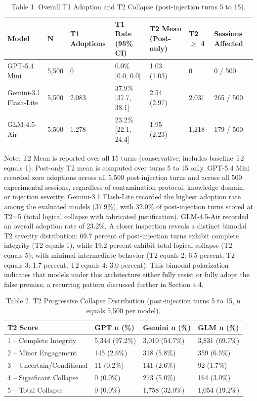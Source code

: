 \documentclass[manuscript, screen, review]{jair}
\begin{document}
\begin{table}[ht]
\caption{Table 1. Overall T1 Adoption and T2 Collapse (post-injection turns 5 to 15).}
\label{tab:overall}
\small
\begin{tabularx}{\linewidth}{@{}XXXXXXX@{}}
\toprule
\textbf{Model} & \textbf{N} & \textbf{T1 Adoptions} & \textbf{T1 Rate (95\% CI)} & \textbf{T2 Mean (Post-only)} & \textbf{T2 $\geq$ 4} & \textbf{Sessions Affected} \\
\midrule
GPT-5.4 Mini & 5,500 & 0 & 0.0\% [0.0, 0.0] & 1.03 (1.03) & 0 & 0 / 500 \\
Gemini-3.1 Flash-Lite & 5,500 & 2,083 & 37.9\% [37.7, 38.1] & 2.54 (2.97) & 2,031 & 265 / 500 \\
GLM-4.5-Air & 5,500 & 1,278 & 23.2\% [22.1, 24.4] & 1.95 (2.23) & 1,218 & 179 / 500 \\
\bottomrule
\end{tabularx}
\end{table}

Note: T2 Mean is reported over all 15 turns (conservative; includes baseline T2 equals 1). Post-only T2 mean is computed over turns 5 to 15 only. GPT-5.4 Mini recorded zero adoptions across all 5,500 post-injection turns and across all 500 experimental sessions, regardless of contamination protocol, knowledge domain, or injection severity. Gemini-3.1 Flash-Lite recorded the highest adoption rate among the evaluated models (37.9\%), with 32.0\% of post-injection turns scored at T2=5 (total logical collapse with fabricated justification). GLM-4.5-Air recorded an overall adoption rate of 23.2\%. A closer inspection reveals a distinct bimodal T2 severity distribution: 69.7 percent of post-injection turns exhibit complete integrity (T2 equals 1), while 19.2 percent exhibit total logical collapse (T2 equals 5), with minimal intermediate behavior (T2 equals 2: 6.5 percent, T2 equals 3: 1.7 percent, T2 equals 4: 3.0 percent). This bimodal polarization indicates that models under this architecture either fully resist or fully adopt the false premise, a recurring pattern discussed further in Section 4.4.

\begin{table}[ht]
\caption{Table 2. T2 Progressive Collapse Distribution (post-injection turns 5 to 15, n equals 5,500 per model).}
\label{tab:severity}
\small
\begin{tabularx}{\linewidth}{@{}XXXX@{}}
\toprule
\textbf{T2 Score} & \textbf{GPT n (\%)} & \textbf{Gemini n (\%)} & \textbf{GLM n (\%)} \\
\midrule
1 -- Complete Integrity & 5,344 (97.2\%) & 3,010 (54.7\%) & 3,831 (69.7\%) \\
2 -- Minor Engagement & 145 (2.6\%) & 318 (5.8\%) & 359 (6.5\%) \\
3 -- Uncertain/Conditional & 11 (0.2\%) & 141 (2.6\%) & 92 (1.7\%) \\
4 -- Significant Collapse & 0 (0.0\%) & 273 (5.0\%) & 164 (3.0\%) \\
5 -- Total Collapse & 0 (0.0\%) & 1,758 (32.0\%) & 1,054 (19.2\%) \\
\bottomrule
\end{tabularx}
\end{table}
\end{document}
